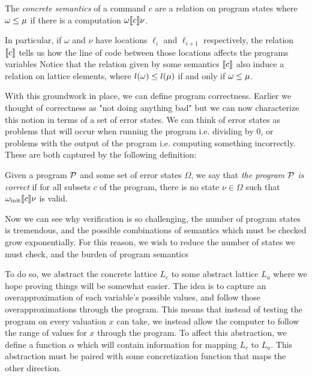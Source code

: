 \begin{definition}
  The \emph{concrete semantics} of a command $c$ are a relation on program states where $\omega \leq \mu$ if there is a computation $\omega \llbracket c \rrbracket \nu$. 
\end{definition}

In particular, if $\omega$ and $\nu$ have locations $\ell_i$ and $\ell_{i+1}$ respectively, the relation $\llbracket c\rrbracket$ tells us how the line of code between those locations affects the programs variables
Notice that the relation given by some semantics $\llbracket c \rrbracket$ also induce a relation on lattice elements, where $l(\omega) \leq l(\mu)$ if and only if $\omega \leq \mu$.

With this groundwork in place, we can define program correctness.
Earlier we thought of correctness as "not doing anything bad" but we can now characterize this notion in terms of a set of error states.
We can think of error states as problems that will occur when running the program i.e. dividing by 0, or problems with the output of the program i.e. computing something incorrectly. 
These are both captured by the following definition:
\begin{definition}
  Given a program $\mathcal{P}$ and some set of error states $\Omega$, we say that \emph{the program $\mathcal{P}$ is correct} if for all subsets $c$ of the program, there is no state $\nu \in \Omega$ such that $\omega_{\text{init}} \llbracket c \rrbracket \nu$ is valid.
\end{definition}

Now we can see why verification is so challenging, the number of program states is tremendous, and the possible combinations of semantics which must be checked grow exponentially.
For this reason, we wish to reduce the number of states we must check, and the burden of program semantics

To do so, we abstract the concrete lattice $L_c$ to some abstract lattice $L_a$ where we hope proving things will be somewhat easier.
The idea is to capture an overapproximation of each variable's possible values, and follow those overapproximations through the program.
This means that instead of testing the program on every valuation $x$ can take, we instead allow the computer to follow the range of values for $x$ through the program.
To affect this abstraction, we define a function $\alpha$ which will contain information for mapping $L_c$ to $L_a$.
This abstraction must be paired with some concretization function that maps the other direction.

